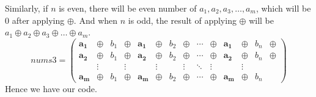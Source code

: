 \documentclass{article}
\begin{document}
	Similarly, if \(n\) is even, there will be even number of \(a_1, a_2, a_3, \dots, a_m\), which will be \(0\) after applying \(\oplus\).
	And when \(n\) is odd, the result of applying \(\oplus\) will be \(a_1 \oplus a_2 \oplus a_3 \oplus \dots \oplus a_m\).
	\[
	nums3 =
	\left (
	{\begin{array}{cccccccccccccccc}
			\mathbf{a_1} & \oplus & b_1 & \oplus & \mathbf{a_1} & \oplus & b_2 & \oplus & \cdots & \oplus & \mathbf{a_1} & \oplus & b_n & \oplus \\
			\mathbf{a_2} & \oplus & b_1 & \oplus & \mathbf{a_2} & \oplus & b_2 & \oplus & \cdots & \oplus & \mathbf{a_2} & \oplus & b_n & \oplus \\
			             & \vdots &     & \vdots &              & \vdots &     & \vdots & \ddots & \vdots &              & \vdots &     &        \\
			\mathbf{a_m} & \oplus & b_1 & \oplus & \mathbf{a_m} & \oplus & b_2 & \oplus & \cdots & \oplus & \mathbf{a_m} & \oplus & b_n & 
	\end{array} } 
	\right )
	\]
	Hence we have our code.
\end{document}
